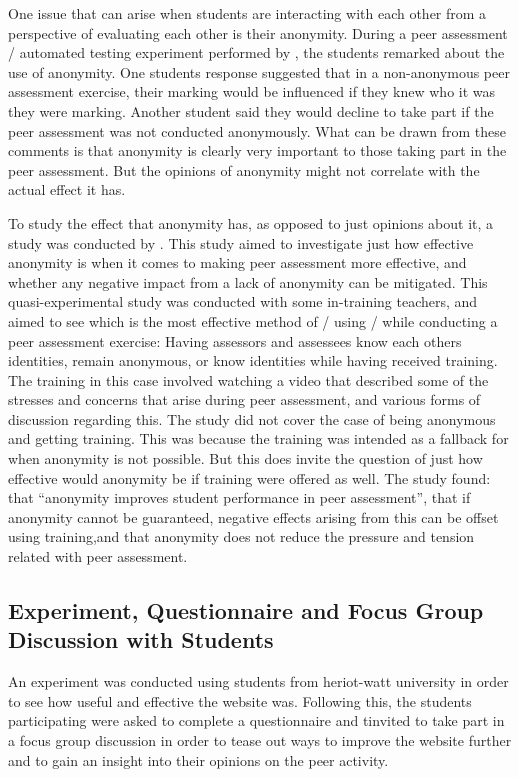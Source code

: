 \documentclass[sigplan,10pt,review]{acmart}\settopmatter{printfolios=true}
\begin{document}

One issue that can arise when students are interacting with each other
from a perspective of evaluating each other is their anonymity. During
a peer assessment / automated testing experiment performed by
\citet{sitthiworachart_effective_2004}, the students remarked about
the use of anonymity. One students response suggested that in a
non-anonymous peer assessment exercise, their marking would be
influenced if they knew who it was they were marking. Another student
said they would decline to take part if the peer assessment was not
conducted anonymously. What can be drawn from these comments is that
anonymity is clearly very important to those taking part in the peer
assessment. But the opinions of anonymity might not correlate with the
actual effect it has.

To study the effect that anonymity has, as opposed to just opinions
about it, a study was conducted by \citet{li_role_2016}. This study
aimed to investigate just how effective anonymity is when it comes to
making peer assessment more effective, and whether any negative impact
from a lack of anonymity can be mitigated.
%
This quasi-experimental study was conducted with some in-training
teachers, and aimed to see which is the most effective method of /
using / while conducting a peer assessment exercise: Having assessors
and assessees know each others identities, remain anonymous, or know
identities while having received training. The training in this case
involved watching a video that described some of the stresses and
concerns that arise during peer assessment, and various forms of
discussion regarding this.
%
The study did not cover the case of being anonymous and getting
training. This was because the training was intended as a fallback for
when anonymity is not possible. But this does invite the question of
just how effective would anonymity be if training were offered as
well.
%
The study found: that ``anonymity improves student performance in peer
assessment'', that if anonymity cannot be guaranteed, negative effects
arising from this can be offset using training,and that anonymity does
not reduce the pressure and tension related with peer assessment.



\subsection{Experiment, Questionnaire and Focus Group Discussion with Students}
An experiment was conducted using students from heriot-watt university
in order to see how useful and effective the website was. Following
this, the students participating were asked to complete a
questionnaire and tinvited to take part in a focus group discussion in
order to tease out ways to improve the website further and to gain an
insight into their opinions on the peer activity.
\end{document}
